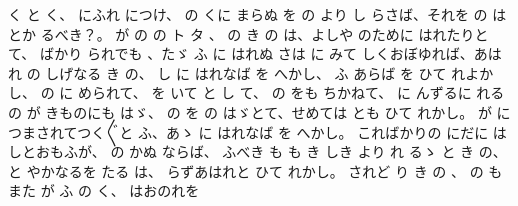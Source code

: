 く
と
く、
にふれ
につけ、
の
くに
まらぬ
を
の
より
し
らさば、それを
の
は
とか
るべき？。
が
の
の
ト
タ
、
の
き
の
は、よしや
のために
はれたりとて、
ばかり
られでも
、たゞ
ふ
に
はれぬ
さは
に
みて
しくおぼゆれば、あはれ
の
しげなる
き
の、
し
に
はれなば
を
へかし、
ふ
あらば
を
ひて
れよかし、
の
に
められて、
を
いて
と
し
て、
の
をも
ちかねて、
に
んずるに
れる
の
が
きものにも
はゞ、
の
を
の
はゞとて、せめては
とも
ひて
れかし。
が
につまされてつく〴〵と
ふ、あゝ
に
はれなば
を
へかし。
こればかりの
にだに
はしとおもふが、
の
かぬ
ならば、
ふべき
も
も
き
しき
より
れ
るゝ
と
き
の、
と
やかなるを
たる
は、
らずあはれと
ひて
れかし。
されど
り
き
の
、
の
もまた
が
ふ
の
く、
はおのれを
